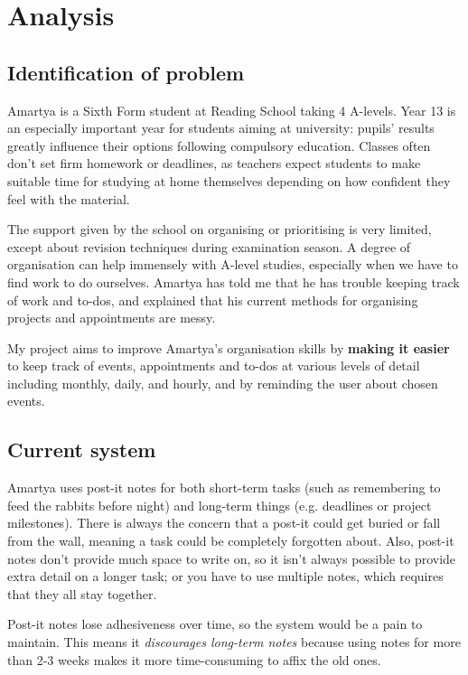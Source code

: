 \section{Analysis}

\subsection{Identification of problem}

Amartya is a Sixth Form student at Reading School taking 4 A-levels. Year 13 is
an especially important year for students aiming at university: pupils' results
greatly influence their options following compulsory education. Classes often
don't set firm homework or deadlines, as teachers expect students to make
suitable time for studying at home themselves depending on how confident they
feel with the material.

The support given by the school on organising or prioritising is very limited,
except about revision techniques during examination season. A degree of
organisation can help immensely with A-level studies, especially when we have to
find work to do ourselves. Amartya has told me that he has trouble keeping track
of work and to-dos, and explained that his current methods for organising
projects and appointments are messy.

My project aims to improve Amartya's organisation skills by \textbf{making it
easier} to keep track of events, appointments and to-dos at various levels of
detail including monthly, daily, and hourly, and by reminding the user about
chosen events.


\subsection{Current system}

Amartya uses post-it notes for both short-term tasks (such as remembering to
feed the rabbits before night) and long-term things (e.g. deadlines or project
milestones). There is always the concern that a post-it could get buried or fall
from the wall, meaning a task could be completely forgotten about. Also, post-it
notes don't provide much space to write on, so it isn't always possible to
provide extra detail on a longer task; or you have to use multiple notes, which
requires that they all stay together.

Post-it notes lose adhesiveness over time, so the system would be a pain to
maintain. This means it \textit{discourages long-term notes} because using notes
for more than 2-3 weeks makes it more time-consuming to affix the old ones.

